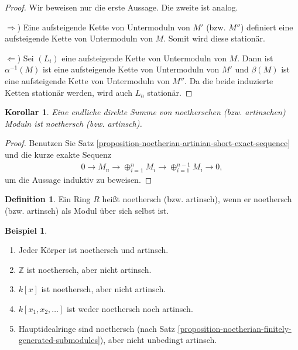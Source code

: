 \documentclass[reqno,12pt]{article}
\numberwithin{equation}{section}
\newcommand{\bZ}{\mathbb{Z}}
\theoremstyle{plain}
\newtheorem{cor}[thm]{Korollar}
\theoremstyle{definition}
\newtheorem{definition}[thm]{Definition}
\newtheorem{example}[thm]{Beispiel}
\begin{document}
\begin{proof}
Wir beweisen nur die erste Aussage. Die zweite ist analog.

$\Rightarrow$) Eine aufsteigende Kette von Untermoduln von $M'$ (bzw. $M''$) definiert eine aufsteigende Kette von Untermoduln von $M$. Somit wird diese stationär.

$\Leftarrow$) Sei $(L_i)$ eine aufsteigende Kette von Untermoduln von $M$. Dann ist $\alpha^{-1}(M)$ ist eine aufsteigende Kette von Untermoduln von $M'$ und $\beta(M)$ ist eine aufsteigende Kette von Untermoduln von $M''$. Da die beide induzierte Ketten stationär werden, wird auch $L_n$ stationär.
\end{proof}



\begin{cor}\label{corollary-finite-direct-sums-noetherian-artinian}
Eine endliche direkte Summe von noetherschen (bzw. artinschen) Moduln ist noethersch (bzw. artinsch).
\end{cor}

\begin{proof}
Benutzen Sie Satz \ref{proposition-noetherian-artinian-short-exact-sequence} und die kurze exakte Sequenz
\begin{align*}
0 \to M_n \to \oplus_{i=1}^n M_i \to \oplus_{i=1}^{n-1} M_i \to 0,
\end{align*}
um die Aussage induktiv zu beweisen.
\end{proof}


\begin{definition}
Ein Ring $R$ heißt {\sf noethersch} (bzw. {\sf artinsch}), wenn er noethersch (bzw. artinsch) als Modul über sich selbst ist.
\end{definition}

\begin{example}
\
\begin{enumerate}
\item Jeder Körper ist noethersch und artinsch.
\item $\bZ$ ist noethersch, aber nicht artinsch.
\item $k[x]$ ist noethersch, aber nicht artinsch.
\item $k[x_1, x_2, \dots ]$ ist weder noethersch noch artinsch.
\item Hauptidealringe sind noethersch (nach Satz \ref{proposition-noetherian-finitely-generated-submodules}), aber nicht unbedingt artinsch.
\end{enumerate}
\end{example}
\end{document}
